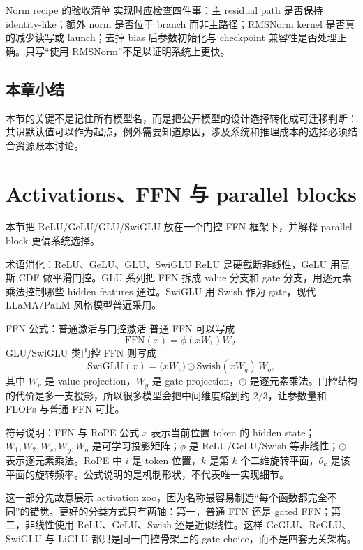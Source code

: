 \documentclass[a4paper]{article}
\begin{document}
\begin{importantbox}{Norm recipe 的验收清单}
实现时应检查四件事：主 residual path 是否保持 identity-like；额外 norm 是否位于 branch 而非主路径；RMSNorm kernel 是否真的减少读写或 launch；去掉 bias 后参数初始化与 checkpoint 兼容性是否处理正确。只写“使用 RMSNorm”不足以证明系统上更快。
\end{importantbox}

\subsection{本章小结}
本节的关键不是记住所有模型名，而是把公开模型的设计选择转化成可迁移判断：共识默认值可以作为起点，例外需要知道原因，涉及系统和推理成本的选择必须结合资源账本讨论。

\section{Activations、FFN 与 parallel blocks}

本节把 ReLU/GeLU/GLU/SwiGLU 放在一个门控 FFN 框架下，并解释 parallel block 更偏系统选择。


\begin{knowledgebox}{术语消化：ReLU、GeLU、GLU、SwiGLU}
ReLU 是硬截断非线性，GeLU 用高斯 CDF 做平滑门控。GLU 系列把 FFN 拆成 value 分支和 gate 分支，用逐元素乘法控制哪些 hidden features 通过。SwiGLU 用 Swish 作为 gate，现代 LLaMA/PaLM 风格模型普遍采用。
\end{knowledgebox}

\begin{importantbox}{FFN 公式：普通激活与门控激活}
普通 FFN 可以写成
\[
\mathrm{FFN}(x)=\phi(xW_1)W_2.
\]
GLU/SwiGLU 类门控 FFN 则写成
\[
\mathrm{SwiGLU}(x)=\bigl(xW_v\bigr)\odot \mathrm{Swish}(xW_g)\,W_o,
\]
其中 \(W_v\) 是 value projection，\(W_g\) 是 gate projection，\(\odot\) 是逐元素乘法。门控结构的代价是多一支投影，所以很多模型会把中间维度缩到约 \(2/3\)，让参数量和 FLOPs 与普通 FFN 可比。
\end{importantbox}

\begin{knowledgebox}{符号说明：FFN 与 RoPE 公式}
\(x\) 表示当前位置 token 的 hidden state；\(W_1,W_2,W_v,W_g,W_o\) 是可学习投影矩阵；\(\phi\) 是 ReLU/GeLU/Swish 等非线性；\(\odot\) 表示逐元素乘法。RoPE 中 \(i\) 是 token 位置，\(k\) 是第 \(k\) 个二维旋转平面，\(\theta_k\) 是该平面的旋转频率。公式说明的是机制形状，不代表唯一实现细节。
\end{knowledgebox}


这一部分先故意展示 activation zoo，因为名称最容易制造“每个函数都完全不同”的错觉。更好的分类方式只有两轴：第一，普通 FFN 还是 gated FFN；第二，非线性使用 ReLU、GeLU、Swish 还是近似线性。这样 GeGLU、ReGLU、SwiGLU 与 LiGLU 都只是同一门控骨架上的 gate choice，而不是四套无关架构。
\end{document}
